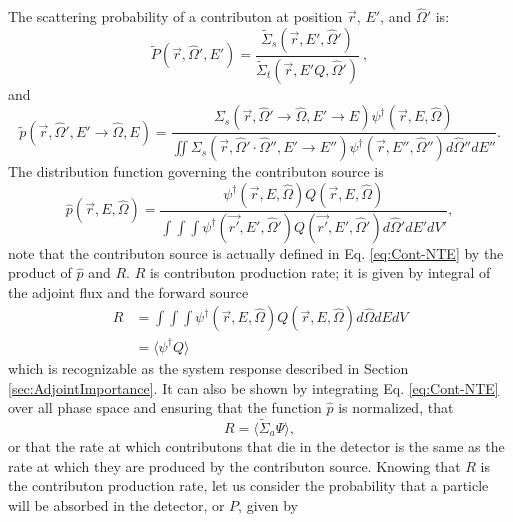The scattering probability of a contributon at position $\vec{r}$, $E'$, and
$\hat\Omega'$ is:
\begin{equation}
\widetilde{P}(\vec{r}, \hat\Omega',E') =
         \frac{\widetilde{\Sigma} _{ s }(\vec{r}, E', \hat\Omega')}
       {\widetilde{\Sigma} _{ t }(\vec{r}, E'Q, \hat\Omega')}\:,
\end{equation}
and
\begin{equation}
\widetilde{p}(\vec{r}, \hat\Omega', E'\rightarrow\hat\Omega, E) =
       \frac{\Sigma_{s}(\vec{r}, \hat\Omega'\rightarrow\hat\Omega, E'\rightarrow E)
       \psi^{\dagger} (\vec{r}, E, \hat\Omega)}
       {\iint \Sigma_{s}(\vec{r},\hat\Omega'\cdot\hat\Omega'',E'\rightarrow
       E'')\psi^{\dagger} (\vec{r}, E'', \hat\Omega'')d\hat\Omega'' dE''}.
\end{equation}
The distribution function governing the contributon source is
\begin{equation}
\hat p(\vec{r}, E, \hat\Omega) =
\frac{\psi^{\dagger}(\vec{r}, E, \hat\Omega) Q(\vec{r},E,\hat\Omega)}
     {\int \int \int \psi^{\dagger}(\vec{r'},E',\hat\Omega')
     Q(\vec{r'},E',\hat\Omega') d\hat\Omega' dE' dV'},
\end{equation}
note that the contributon source is actually defined in Eq.
\eqref{eq:Cont-NTE} by the product of $\hat{p}$
and $R$. $R$ is contributon production rate; it
is given by integral of the adjoint flux and the forward source
\begin{equation}
  \begin{split}
R &= \int \int \int \psi^{\dagger}(\vec{r},E,\hat\Omega)Q(\vec{r},E,\hat\Omega)
    d\hat\Omega dE dV \\
  & = \langle \psi^{\dagger}Q  \rangle
\end{split}
\end{equation}
which is recognizable as the system response described
in Section \ref{sec:AdjointImportance}. It can also be shown by integrating Eq.
\eqref{eq:Cont-NTE} over all phase space and ensuring that the function
$\hat{p}$ is normalized, that
\begin{equation}
  R = \langle \widetilde{\Sigma}_a \Psi \rangle,
  \label{eq:contribprod}
\end{equation}
or that the rate at which contributons that die in the detector is the same as
the rate at which they are produced by the contributon source.
Knowing that $R$ is the contributon production rate, let us consider the
probability that a particle will be absorbed in the detector, or $P$, given by
